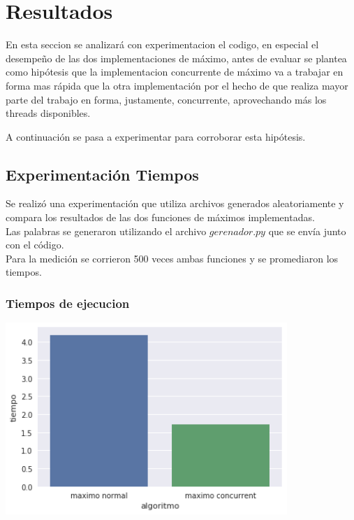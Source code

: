 \section{Resultados}

En esta seccion se analizará con experimentacion el codigo, en especial el desempeño de las dos implementaciones de máximo, antes de
evaluar se plantea como hipótesis que la implementacion concurrente de máximo va a trabajar en forma mas rápida que la otra implementación
por el hecho de que realiza mayor parte del trabajo en forma, justamente, concurrente, aprovechando más los threads disponibles.


A continuación se pasa a experimentar para corroborar esta hipótesis.

\subsection{Experimentación Tiempos}
Se realizó una experimentación que utiliza archivos generados aleatoriamente y compara los resultados de las dos funciones de máximos implementadas.\\

Las palabras se generaron utilizando el archivo $gerenador.py$ que se envía junto con el código.\\

Para la medición se corrieron 500 veces ambas funciones y se promediaron los tiempos.

\subsubsection{Tiempos de ejecucion} %

\begin{center}
\includegraphics[width=0.8\textwidth]{imagenes/maxvsmax.png}
\end{center}

